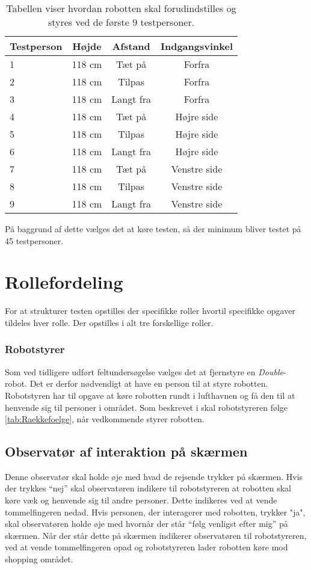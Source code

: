 %
\begin{table}[H]
	\centering 
	\begin{tabular}{l|c|c|c}
		Testperson  & Højde & Afstand & Indgangsvinkel \\\hline
		1   & 118 cm & Tæt på & Forfra  \\\hline
		2   & 118 cm & Tilpas & Forfra \\ \hline
		3   & 118 cm & Langt fra  & Forfra \\ \hline
		4   & 118 cm & Tæt på & Højre side \\ \hline
		5   & 118 cm & Tilpas & Højre side \\ \hline
		6   & 118 cm & Langt fra & Højre side \\ \hline
		7   & 118 cm & Tæt på & Venstre side \\ \hline
		8   & 118 cm & Tilpas & Venstre side \\ \hline
		9   & 118 cm & Langt fra  & Venstre side 
	\end{tabular} 
	\caption{Tabellen viser hvordan robotten skal forudindstilles og styres ved de første 9 testpersoner.}
	\label{tab:Raekkefoelge}       
\end{table}
\noindent
%
På baggrund af dette vælges det at køre testen, så der minimum bliver testet på 45 testpersoner.

\section{Rollefordeling}
\label{TestAfSkalaRollefordeling}
%
For at strukturer testen opstilles der specifikke roller hvortil specifikke opgaver tildeles hver rolle. Der opstilles i alt tre forskellige roller. 
%
\subsubsection*{Robotstyrer}
Som ved tidligere udført feltundersøgelse vælges det at fjernstyre en \textit{Double}-robot. Det er derfor nødvendigt at have en person til at styre robotten. \blankline
%
Robotstyren har til opgave at køre robotten rundt i lufthavnen og få den til at henvende sig til personer i området. Som beskrevet i  skal robotstyreren følge \autoref{tab:Raekkefoelge}, når vedkommende styrer robotten.

\subsection{Observatør af interaktion på skærmen}
Denne observatør skal holde øje med hvad de rejsende trykker på skærmen. Hvis der trykkes “nej” skal observatøren indikere til robotstyreren at robotten skal køre væk og henvende sig til andre personer. Dette indikeres ved at vende tommelfingeren nedad. 
Hvis personen, der interagerer med robotten, trykker "ja", skal observatøren holde øje med hvornår der står “følg venligst efter mig” på skærmen. Når der står dette på skærmen indikerer observatøren til robotstyreren, ved at vende tommelfingeren opad og robotstyreren lader robotten køre mod shopping området. 

